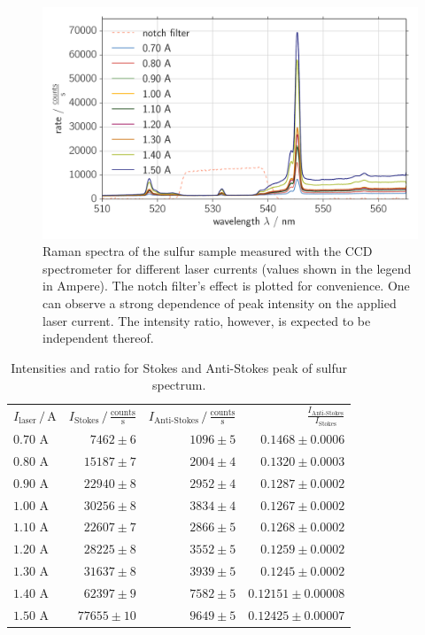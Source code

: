 \begin{figure}[htpb]
    \centering
    \includegraphics[width=0.8\linewidth]{analysis/figures/ccd_sulfur_spectra}
    \caption{
        Raman spectra of the sulfur sample measured with the CCD spectrometer for different 
        laser currents (values shown in the legend in Ampere). The notch filter's 
        effect is plotted for convenience. One can observe a strong dependence of peak intensity 
        on the applied laser current. The intensity ratio, however, is expected to be independent 
        thereof. 
        }
    \label{fig:ccd_sulfur_spectra}
\end{figure}


\begin{table}[htpb]
    \centering
    \caption{
        Intensities and ratio for Stokes and Anti-Stokes peak of sulfur spectrum.
        }
    \label{tab:sulfur_intensity}
    \begin{tabular}{l r r r}
        \rowcolor{LightCyan}$I_\text{laser} \, / \, \text{A}$ & 
        $I_\text{Stokes} \, / \, \frac{\text{counts}}{\text{s}}$ &
        $I_\text{Anti-Stokes} \, / \, \frac{\text{counts}}{\text{s}}$ &
        $\frac{I_\text{Anti-Stokes}}{I_\text{Stokes}}$ \\
        \cellcolor{LightCyan}$0.70$ A & $7462 \pm 6$ & $1096 \pm 5$ & $0.1468 \pm 0.0006$   \\
        \cellcolor{LightCyan}$0.80$ A & $15187 \pm 7$ & $2004 \pm 4$ & $0.1320 \pm 0.0003$   \\
        \cellcolor{LightCyan}$0.90$ A & $22940 \pm 8$ & $2952 \pm 4$ & $0.1287 \pm 0.0002$   \\
        \cellcolor{LightCyan}$1.00$ A & $30256 \pm 8$ & $3834 \pm 4$ & $0.1267 \pm 0.0002$   \\
        \cellcolor{LightCyan}$1.10$ A & $22607 \pm 7$ & $2866 \pm 5$ & $0.1268 \pm 0.0002$   \\
        \cellcolor{LightCyan}$1.20$ A & $28225 \pm 8$ & $3552 \pm 5$ & $0.1259 \pm 0.0002$   \\
        \cellcolor{LightCyan}$1.30$ A & $31637 \pm 8$ & $3939 \pm 5$ & $0.1245 \pm 0.0002$   \\
        \cellcolor{LightCyan}$1.40$ A & $62397 \pm 9$ & $7582 \pm 5$ & $0.12151 \pm 0.00008$   \\
        \cellcolor{LightCyan}$1.50$ A & $77655 \pm 10$ & $9649 \pm 5$ & $0.12425 \pm 0.00007$   
    \end{tabular}
\end{table}

